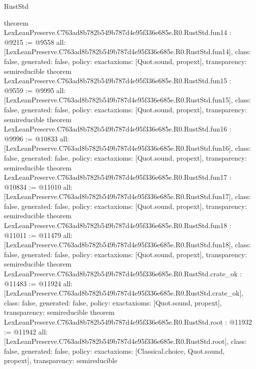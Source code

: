 \begin{lexlean}{RustStd}
\begin{coremodule}
{}
theorem LexLeanPreserve.C763ad8b782b549b787d4e95f336e685e.R0.RustStd.fun14 : @9215 := @9558 {
  all: [LexLeanPreserve.C763ad8b782b549b787d4e95f336e685e.R0.RustStd.fun14],
  class: false,
  generated: false,
  policy: exact{axioms: [Quot.sound, propext]},
  transparency: semireducible
}
theorem LexLeanPreserve.C763ad8b782b549b787d4e95f336e685e.R0.RustStd.fun15 : @9559 := @9995 {
  all: [LexLeanPreserve.C763ad8b782b549b787d4e95f336e685e.R0.RustStd.fun15],
  class: false,
  generated: false,
  policy: exact{axioms: [Quot.sound, propext]},
  transparency: semireducible
}
theorem LexLeanPreserve.C763ad8b782b549b787d4e95f336e685e.R0.RustStd.fun16 : @9996 := @10833 {
  all: [LexLeanPreserve.C763ad8b782b549b787d4e95f336e685e.R0.RustStd.fun16],
  class: false,
  generated: false,
  policy: exact{axioms: [Quot.sound, propext]},
  transparency: semireducible
}
theorem LexLeanPreserve.C763ad8b782b549b787d4e95f336e685e.R0.RustStd.fun17 : @10834 := @11010 {
  all: [LexLeanPreserve.C763ad8b782b549b787d4e95f336e685e.R0.RustStd.fun17],
  class: false,
  generated: false,
  policy: exact{axioms: [Quot.sound, propext]},
  transparency: semireducible
}
theorem LexLeanPreserve.C763ad8b782b549b787d4e95f336e685e.R0.RustStd.fun18 : @11011 := @11479 {
  all: [LexLeanPreserve.C763ad8b782b549b787d4e95f336e685e.R0.RustStd.fun18],
  class: false,
  generated: false,
  policy: exact{axioms: [Quot.sound, propext]},
  transparency: semireducible
}
theorem LexLeanPreserve.C763ad8b782b549b787d4e95f336e685e.R0.RustStd.crate_ok : @11483 := @11924 {
  all: [LexLeanPreserve.C763ad8b782b549b787d4e95f336e685e.R0.RustStd.crate_ok],
  class: false,
  generated: false,
  policy: exact{axioms: [Quot.sound, propext]},
  transparency: semireducible
}
theorem LexLeanPreserve.C763ad8b782b549b787d4e95f336e685e.R0.RustStd.root : @11932 := @11942 {
  all: [LexLeanPreserve.C763ad8b782b549b787d4e95f336e685e.R0.RustStd.root],
  class: false,
  generated: false,
  policy: exact{axioms: [Classical.choice, Quot.sound, propext]},
  transparency: semireducible
}


\end{coremodule}
\end{lexlean}
